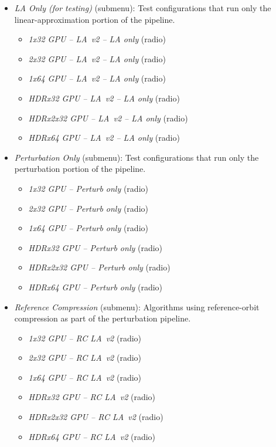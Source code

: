 \begin{itemize}
\begin{itemize}
      \item \emph{LA Only (for testing)} (submenu): Test configurations that run only the linear-approximation portion of the pipeline.
        \begin{itemize}
          \item \emph{1x32 GPU -- LA~v2 -- LA only} (radio)
          \item \emph{2x32 GPU -- LA~v2 -- LA only} (radio)
          \item \emph{1x64 GPU -- LA~v2 -- LA only} (radio)
          \item \emph{HDRx32 GPU -- LA~v2 -- LA only} (radio)
          \item \emph{HDRx2x32 GPU -- LA~v2 -- LA only} (radio)
          \item \emph{HDRx64 GPU -- LA~v2 -- LA only} (radio)
        \end{itemize}

      \item \emph{Perturbation Only} (submenu): Test configurations that run only the perturbation portion of the pipeline.
        \begin{itemize}
          \item \emph{1x32 GPU -- Perturb only} (radio)
          \item \emph{2x32 GPU -- Perturb only} (radio)
          \item \emph{1x64 GPU -- Perturb only} (radio)
          \item \emph{HDRx32 GPU -- Perturb only} (radio)
          \item \emph{HDRx2x32 GPU -- Perturb only} (radio)
          \item \emph{HDRx64 GPU -- Perturb only} (radio)
        \end{itemize}

      \item \emph{Reference Compression} (submenu): Algorithms using reference-orbit compression as part of the perturbation pipeline.
        \begin{itemize}
          \item \emph{1x32 GPU -- RC LA~v2} (radio)
          \item \emph{2x32 GPU -- RC LA~v2} (radio)
          \item \emph{1x64 GPU -- RC LA~v2} (radio)
          \item \emph{HDRx32 GPU -- RC LA~v2} (radio)
          \item \emph{HDRx2x32 GPU -- RC LA~v2} (radio)
          \item \emph{HDRx64 GPU -- RC LA~v2} (radio)


\end{itemize}
\end{itemize}
\end{itemize}
